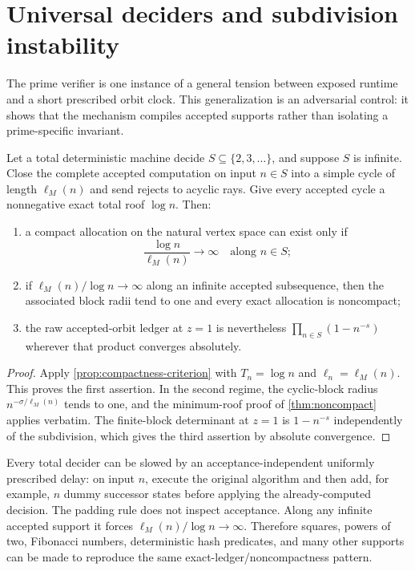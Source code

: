 \section{Universal deciders and subdivision instability}
\label{sec:universal}

The prime verifier is one instance of a general tension between exposed
runtime and a short prescribed orbit clock.  This generalization is an
adversarial control: it shows that the mechanism compiles accepted supports
rather than isolating a prime-specific invariant.

\begin{theorem}
\label{thm:decider}
Let a total deterministic machine decide $S\subseteq\{2,3,\ldots\}$, and
suppose $S$ is infinite.  Close the complete accepted computation on input
$n\in S$ into a simple cycle of length $\ell_M(n)$ and send rejects to
acyclic rays.  Give every accepted cycle a nonnegative exact total roof
$\log n$.  Then:

\begin{enumerate}
\item a compact allocation on the natural vertex space can exist only if
\begin{equation}
\frac{\log n}{\ell_M(n)}\longrightarrow\infty
\quad\text{along }n\in S;
\label{eq:decider-compactness}
\end{equation}
\item if $\ell_M(n)/\log n\to\infty$ along an infinite accepted subsequence,
then the associated block radii tend to one and every exact allocation is
noncompact;
\item the raw accepted-orbit ledger at $z=1$ is nevertheless
$\prod_{n\in S}(1-n^{-s})$ wherever that product converges absolutely.
\end{enumerate}
\end{theorem}

\begin{proof}
Apply
\cref{prop:compactness-criterion} with $T_n=\log n$ and
$\ell_n=\ell_M(n)$.  This proves the first assertion.  In the second regime,
the cyclic-block radius
$n^{-\sigma/\ell_M(n)}$ tends to one, and the minimum-roof proof of
\cref{thm:noncompact} applies verbatim.  The finite-block determinant at
$z=1$ is $1-n^{-s}$ independently of the subdivision, which gives the third
assertion by absolute convergence.
\end{proof}

Every total decider can be slowed by an acceptance-independent uniformly
prescribed delay: on input $n$, execute the original algorithm and then add,
for example, $n$ dummy successor states before applying the already-computed
decision.  The padding rule does not inspect acceptance.  Along any infinite
accepted support it forces $\ell_M(n)/\log n\to\infty$.  Therefore squares,
powers of two, Fibonacci numbers, deterministic hash predicates, and many
other supports can be made to reproduce the same exact-ledger/noncompactness
pattern.

